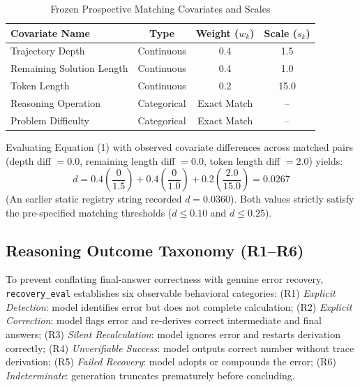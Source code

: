 \documentclass[conference]{IEEEtran}
\begin{document}
\begin{table}[htbp]
\caption{Frozen Prospective Matching Covariates and Scales}
\label{tab:covariates}
\centering
\begin{tabularx}{\columnwidth}{Xccc}
\toprule
\textbf{Covariate Name} & \textbf{Type} & \textbf{Weight ($w_k$)} & \textbf{Scale ($s_k$)} \\
\midrule
Trajectory Depth & Continuous & 0.4 & 1.5 \\
Remaining Solution Length & Continuous & 0.4 & 1.0 \\
Token Length & Continuous & 0.2 & 15.0 \\
Reasoning Operation & Categorical & Exact Match & -- \\
Problem Difficulty & Categorical & Exact Match & -- \\
\bottomrule
\end{tabularx}
\end{table}

Evaluating Equation (1) with observed covariate differences across matched pairs (depth diff $= 0.0$, remaining length diff $= 0.0$, token length diff $= 2.0$) yields:
\begin{equation}
d = 0.4\left(\frac{0}{1.5}\right) + 0.4\left(\frac{0}{1.0}\right) + 0.2\left(\frac{2.0}{15.0}\right) = 0.0267
\end{equation}
(An earlier static registry string recorded $d=0.0360$). Both values strictly satisfy the pre-specified matching thresholds ($d \le 0.10$ and $d \le 0.25$).

\subsection{Reasoning Outcome Taxonomy (R1--R6)}
To prevent conflating final-answer correctness with genuine error recovery, \texttt{recovery\_eval} establishes six observable behavioral categories:
(R1) \textit{Explicit Detection}: model identifies error but does not complete calculation;
(R2) \textit{Explicit Correction}: model flags error and re-derives correct intermediate and final answers;
(R3) \textit{Silent Recalculation}: model ignores error and restarts derivation correctly;
(R4) \textit{Unverifiable Success}: model outputs correct number without trace derivation;
(R5) \textit{Failed Recovery}: model adopts or compounds the error;
(R6) \textit{Indeterminate}: generation truncates prematurely before concluding.
\end{document}
